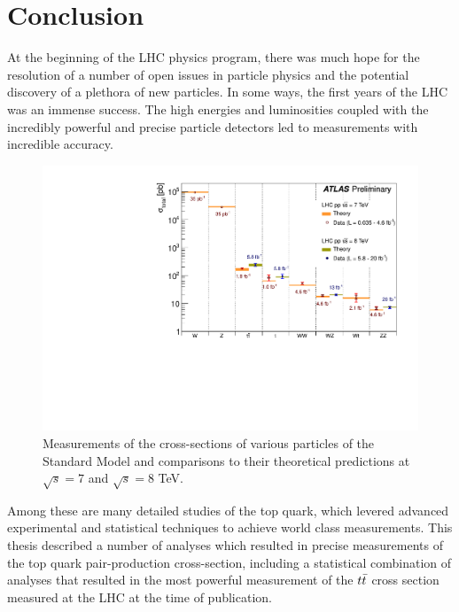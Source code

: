 

\chapter{Conclusion}

At the beginning of the LHC physics program, there was much hope for the
resolution of a number of open issues in particle physics and the potential
discovery of a plethora of new particles.
In some ways, the first years of the LHC was an immense success.
The high energies and luminosities coupled with the incredibly powerful
and precise particle detectors led to measurements with incredible
accuracy.

\begin{figure}[ht!]
  \begin{center}
    \includegraphics[width=.75\textwidth]{figures/conclusion/SM_SummaryPlotMoriondEWK2013}
    \caption{Measurements of the cross-sections of various particles of the Standard Model and comparisons to their theoretical predictions at $\sqrt{s}=7$ and $\sqrt{s} = 8$ TeV.}
    \label{fig:xsec_vs_roots}
  \end{center}
\end{figure}


Among these are many detailed studies of the top quark, which levered
advanced experimental and statistical techniques to achieve world class measurements.
This thesis described a number of analyses which resulted in precise measurements
of the top quark pair-production cross-section, including a statistical combination
of analyses that resulted in the most powerful measurement of the $t\bar{t}$ cross
section measured at the LHC at the time of publication.

